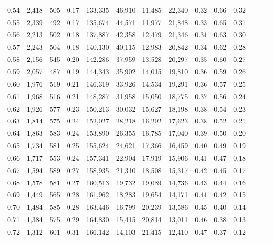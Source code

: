 \begin{tabular}{rrrrrrrrrrrrrr}
0.54 &  2,418 &    505 &  0.17 &  133,335 &   46,910 &  11,485 &  22,340 &  0.32 &  0.66 &      0.32 \\
0.55 &  2,339 &    492 &  0.17 &  135,674 &   44,571 &  11,977 &  21,848 &  0.33 &  0.65 &      0.31 \\
0.56 &  2,213 &    502 &  0.18 &  137,887 &   42,358 &  12,479 &  21,346 &  0.34 &  0.63 &      0.30 \\
0.57 &  2,243 &    504 &  0.18 &  140,130 &   40,115 &  12,983 &  20,842 &  0.34 &  0.62 &      0.28 \\
0.58 &  2,156 &    545 &  0.20 &  142,286 &   37,959 &  13,528 &  20,297 &  0.35 &  0.60 &      0.27 \\
0.59 &  2,057 &    487 &  0.19 &  144,343 &   35,902 &  14,015 &  19,810 &  0.36 &  0.59 &      0.26 \\
0.60 &  1,976 &    519 &  0.21 &  146,319 &   33,926 &  14,534 &  19,291 &  0.36 &  0.57 &      0.25 \\
0.61 &  1,968 &    516 &  0.21 &  148,287 &   31,958 &  15,050 &  18,775 &  0.37 &  0.56 &      0.24 \\
0.62 &  1,926 &    577 &  0.23 &  150,213 &   30,032 &  15,627 &  18,198 &  0.38 &  0.54 &      0.23 \\
0.63 &  1,814 &    575 &  0.24 &  152,027 &   28,218 &  16,202 &  17,623 &  0.38 &  0.52 &      0.21 \\
0.64 &  1,863 &    583 &  0.24 &  153,890 &   26,355 &  16,785 &  17,040 &  0.39 &  0.50 &      0.20 \\
0.65 &  1,734 &    581 &  0.25 &  155,624 &   24,621 &  17,366 &  16,459 &  0.40 &  0.49 &      0.19 \\
0.66 &  1,717 &    553 &  0.24 &  157,341 &   22,904 &  17,919 &  15,906 &  0.41 &  0.47 &      0.18 \\
0.67 &  1,594 &    589 &  0.27 &  158,935 &   21,310 &  18,508 &  15,317 &  0.42 &  0.45 &      0.17 \\
0.68 &  1,578 &    581 &  0.27 &  160,513 &   19,732 &  19,089 &  14,736 &  0.43 &  0.44 &      0.16 \\
0.69 &  1,449 &    565 &  0.28 &  161,962 &   18,283 &  19,654 &  14,171 &  0.44 &  0.42 &      0.15 \\
0.70 &  1,484 &    585 &  0.28 &  163,446 &   16,799 &  20,239 &  13,586 &  0.45 &  0.40 &      0.14 \\
0.71 &  1,384 &    575 &  0.29 &  164,830 &   15,415 &  20,814 &  13,011 &  0.46 &  0.38 &      0.13 \\
0.72 &  1,312 &    601 &  0.31 &  166,142 &   14,103 &  21,415 &  12,410 &  0.47 &  0.37 &      0.12 \\

\end{tabular}
